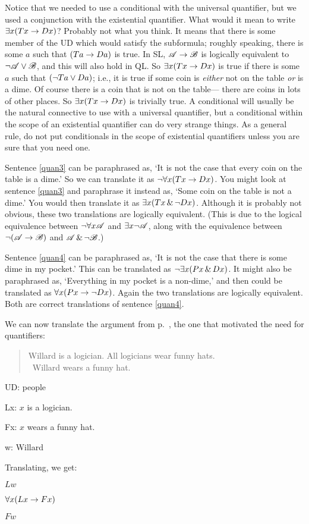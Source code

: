 Notice that we needed to use a conditional with the universal quantifier, but we used a conjunction with the existential quantifier. What would it mean to write $\exists x(Tx \rightarrow Dx)$? Probably not what you think. It means that there is some member of the UD which would satisfy the subformula; roughly speaking, there is some $a$ such that $(Ta \rightarrow Da)$ is true. In SL, $\mathscr{A} \rightarrow \mathscr{B}$ is logically equivalent to $\neg\mathscr{A} \vee \mathscr{B}$, and this will also hold in QL. So $\exists x(Tx \rightarrow Dx)$ is true if there is some $a$ such that $(\neg Ta \vee Da)$; i.e., it is true if some coin is \emph{either} not on the table \emph{or} is a dime. Of course there is a coin that is not on the table--- there are coins in lots of other places. So $\exists x(Tx \rightarrow Dx)$ is trivially true. A conditional will usually be the natural connective to use with a universal quantifier, but a conditional within the scope of an existential quantifier can do very strange things. As a general rule, do not put conditionals in the scope of existential quantifiers unless you are sure that you need one.

Sentence \ref{quan3} can be paraphrased as, `It is not the case that every coin on the table is a dime.' So we can translate it as $\neg \forall x(Tx \rightarrow Dx)$. You might look at sentence \ref{quan3} and paraphrase it instead as, `Some coin on the table is not a dime.' You would then translate it as $\exists x(Tx \,\&\, \neg Dx)$. Although it is probably not obvious, these two translations are logically equivalent. (This is due to the logical equivalence between $\neg\forall x\mathscr{A}$ and $\exists x\neg\mathscr{A}$, along with the equivalence between $\neg(\mathscr{A}\rightarrow\mathscr{B})$ and $\mathscr{A}\,\&\,\neg\mathscr{B}$.)

Sentence \ref{quan4} can be paraphrased as, `It is not the case that there is some dime in my pocket.' This can be translated as $\neg\exists x(Px \,\&\, Dx)$. It might also be paraphrased as, `Everything in my pocket is a non-dime,' and then could be translated as $\forall x(Px \rightarrow \neg Dx)$. Again the two translations are logically equivalent. Both are correct translations of sentence \ref{quan4}.

We can now translate the argument from p.~\pageref{willard1}, the one that motivated the need for quantifiers:
\begin{quote}
Willard is a logician. All logicians wear funny hats.\\
\therefore\ Willard wears a funny hat.
\end{quote}
\begin{ekey}
\item[UD:] people
\item[Lx:] $x$ is a logician.
\item[Fx:] $x$ wears a funny hat.
\item[w:] Willard
\end{ekey}
Translating, we get:
\begin{earg}
\item[] $Lw$
\item[] $\forall x(Lx \rightarrow Fx)$
\item[\therefore] $Fw$
\end{earg}

